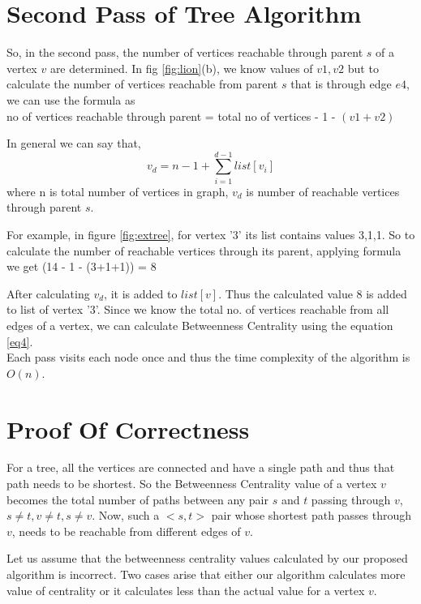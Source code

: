 \section{Second Pass of Tree Algorithm}
\vspace{-1.0em}
So, in the second pass, the number of vertices reachable through parent $s$ of a vertex $v$ are determined.
In fig \ref{fig:lion}(b), we know values of $v1,v2$ but to calculate the number of vertices reachable from parent $s$ that is through edge $e4$, we can use the formula as
\\
no of vertices reachable through parent = total no of vertices - 1 - $(v1 + v2)$

In general we can say that,
\begin{equation} \label{eq5}
v_{d} = n - 1 + \sum_{i=1}^{d-1} list[v_{i}]
\end{equation}
where n is total number of vertices in graph, $v_{d}$ is number of reachable vertices through parent $s$.

For example, in figure \ref{fig:extree}, for vertex '3' its list contains values 3,1,1. So to calculate the number of reachable vertices through its parent, applying formula we get (14 - 1 - (3+1+1)) = 8 

After calculating $v_{d}$, it is added to $list[v]$.
Thus the calculated value 8 is added to list of vertex '3'.
Since we know the total no. of vertices reachable from all edges of a vertex, we can calculate Betweenness Centrality using the equation \ref{eq4}.
\\
Each pass visits each node once and thus the time complexity of the algorithm is $O(n)$.


\section{Proof Of Correctness}

For a tree, all the vertices are connected and have a single path and thus that path needs to be shortest. So the Betweenness Centrality value of a vertex $v$ becomes the total number of paths between any pair $s$ and $t$ passing through $v$, $s \neq t, v\neq t, s\neq v$. Now, such a $<s,t>$ pair whose shortest path passes through $v$, needs to be reachable from different edges of $v$. 

Let us assume that the betweenness centrality values calculated by our proposed algorithm is incorrect. Two cases arise that either our algorithm calculates more value of centrality or it calculates less than the actual value for a vertex $v$.


